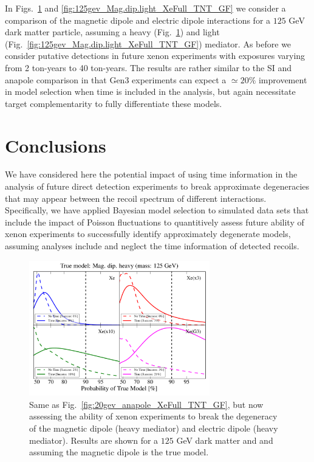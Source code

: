 \documentclass[11pt]{article}
\newcommand{\Fig}[1]{Fig.~\ref{#1}} \newcommand{\Figs}[2]{Figs.~\ref{#1} and \ref{#2}}
\begin{document}
In \Figs{fig:125gev_Mag.dip.heavy_XeFull_TNT_GF}{fig:125gev_Mag.dip.light_XeFull_TNT_GF} we consider a comparison of the magnetic dipole and electric dipole interactions for a $125$ GeV dark matter particle, assuming a heavy (\Fig{fig:125gev_Mag.dip.heavy_XeFull_TNT_GF}) and light (\Fig{fig:125gev_Mag.dip.light_XeFull_TNT_GF}) mediator. As before we consider putative detections in future xenon experiments with exposures varying from 2 ton-years to 40 ton-years. The results are rather similar to the SI and anapole comparison in that Gen3 experiments can expect a $\simeq 20\%$ improvement in model selection when time is included in the analysis, but again necessitate target complementarity to fully differentiate these models.








\section{Conclusions}\label{sec:conclusion}
We have considered here the potential impact of using time information in the analysis of future direct detection experiments to break approximate degeneracies that may appear between the recoil spectrum of different interactions. Specifically, we have applied Bayesian model selection to simulated data sets that include the impact of Poisson fluctuations to quantitively assess future ability of xenon experiments to successfully identify approximately degenerate models, assuming analyses include and neglect the time information of detected recoils.

 
 \begin{figure}
\centering
\includegraphics[width=0.7\textwidth]{plots/PDF_125GeV_Magdipheavy_50sims_Xe_Xe3x_Xe10x_XeG3_GF_TNT.pdf}
\caption{\label{fig:125gev_Mag.dip.heavy_XeFull_TNT_GF}
Same as Fig.~\ref{fig:20gev_anapole_XeFull_TNT_GF}, but now assessing the ability of xenon experiments to break the degeneracy of the magnetic dipole (heavy mediator) and electric dipole (heavy mediator). Results are shown for a $125$ GeV dark matter and and assuming the magnetic dipole is the true model.}
\end{figure}
\end{document}
